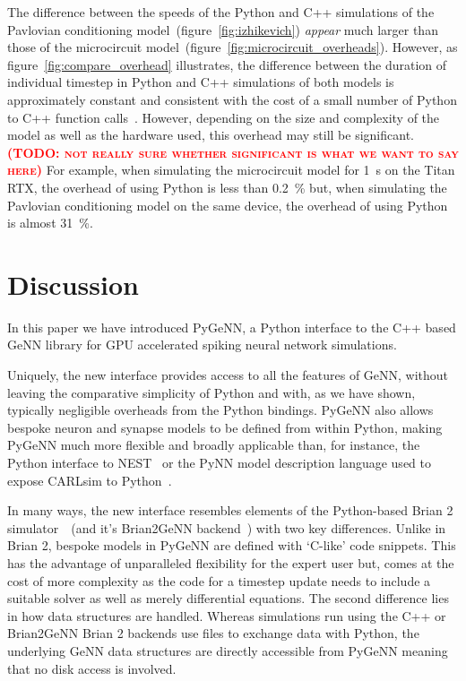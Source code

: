 \documentclass[utf8]{frontiersSCNS} %
\newcommand{\todo}[1]{\textbf{\textsc{\textcolor{red}{(TODO: #1)}}}}
\begin{document}
The difference between the speeds of the Python and C++ simulations of the Pavlovian conditioning model~(figure~\ref{fig:izhikevich}) \emph{appear} much larger than those of the microcircuit model~(figure~\ref{fig:microcircuit_overheads}).
However, as figure~\ref{fig:compare_overhead} illustrates, the difference between the duration of individual timestep in Python and C++ simulations of both models is approximately constant and consistent with the cost of a small number of Python to C++ function calls~\citep{Crail2019}.
However, depending on the size and complexity of the model as well as the hardware used, this overhead may still be significant.\todo{not really sure whether significant is what we want to say here}
For example, when simulating the microcircuit model for \SI{1}{\second} on the Titan RTX, the overhead of using Python is less than \SI{0.2}{\percent} but, when simulating the Pavlovian conditioning model on the same device, the overhead of using Python is almost \SI{31}{\percent}.

\section{Discussion}
In this paper we have introduced PyGeNN, a Python interface to the C++ based GeNN library for GPU accelerated spiking neural network simulations.

Uniquely, the new interface provides access to all the features of GeNN, without leaving the comparative simplicity of Python and with, as we have shown, typically negligible overheads from the Python bindings.
PyGeNN also allows bespoke neuron and synapse models to be defined from within Python, making PyGeNN much more flexible and broadly applicable than, for instance, the Python interface to NEST~\citep{Eppler2009} or the PyNN model description language used to expose CARLsim to Python~\citep{Balaji2020}.

In many ways, the new interface resembles elements of the Python-based Brian 2 simulator~\citep{Stimberg2019}~(and it's Brian2GeNN backend~\citep{Stimberg2020}) with two key differences.
Unlike in Brian 2, bespoke models in PyGeNN are defined with `C-like' code snippets. 
This has the advantage of unparalleled flexibility for the expert user but, comes at the cost of more complexity as the code for a timestep update needs to include a suitable solver as well as merely differential equations.
The second difference lies in how data structures are handled. 
Whereas simulations run using the C++ or Brian2GeNN Brian 2 backends use files to exchange data with Python, the underlying GeNN data structures are directly accessible from PyGeNN meaning that no disk access is involved.
\end{document}
